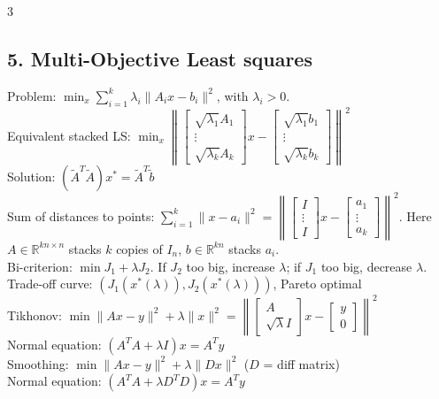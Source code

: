 \documentclass[8pt,landscape]{extarticle}
\newcommand{\R}{\mathbb{R}}
\newcommand{\norm}[1]{\|#1\|}
\newcommand{\1}{\mathbf{1}}
\newcommand{\0}{\mathbf{0}}
\begin{document}
\begin{multicols*}{3}
\subsection*{5. Multi-Objective Least squares}
Problem: $\min_x \sum_{i=1}^k \lambda_i\|A_ix-b_i\|^2$, with $\lambda_i>0$. \\
Equivalent stacked LS:
$\min_x\left\|\begin{bmatrix}\sqrt{\lambda_1}A_1\\ \vdots\\ \sqrt{\lambda_k}A_k\end{bmatrix}x-
\begin{bmatrix}\sqrt{\lambda_1}b_1\\ \vdots\\ \sqrt{\lambda_k}b_k\end{bmatrix}\right\|^2$ \\
Solution: $(\tilde A^T\tilde A)x^* = \tilde A^T\tilde b$ \\
Sum of distances to points: $\sum_{i=1}^k\|x-a_i\|^2
= \left\|\begin{bmatrix}I\\ \vdots\\ I\end{bmatrix}x
-\begin{bmatrix}a_1\\ \vdots\\ a_k\end{bmatrix}\right\|^2$.
Here $A\in\R^{kn\times n}$ stacks $k$ copies of $I_n$, $b\in\R^{kn}$ stacks $a_i$.\\
Bi-criterion: $\min J_1+\lambda J_2$. If $J_2$ too big, increase $\lambda$; if $J_1$ too big, decrease $\lambda$. \\
Trade-off curve: $(J_1(x^*(\lambda)), J_2(x^*(\lambda)))$, Pareto optimal \\
Tikhonov: $\min \norm{Ax-y}^2 + \lambda\norm{x}^2 = \left\|\begin{bmatrix}A\\\sqrt{\lambda}I\end{bmatrix}x-\begin{bmatrix}y\\0\end{bmatrix}\right\|^2$ \\ 
Normal equation: $(A^TA+\lambda I)x=A^Ty$ \\
Smoothing: $\min \norm{Ax-y}^2 + \lambda\norm{Dx}^2$ ($D$ = diff matrix) \\
Normal equation:  $(A^TA+\lambda D^TD)x=A^Ty$ \\


\end{multicols*}
\end{document}
